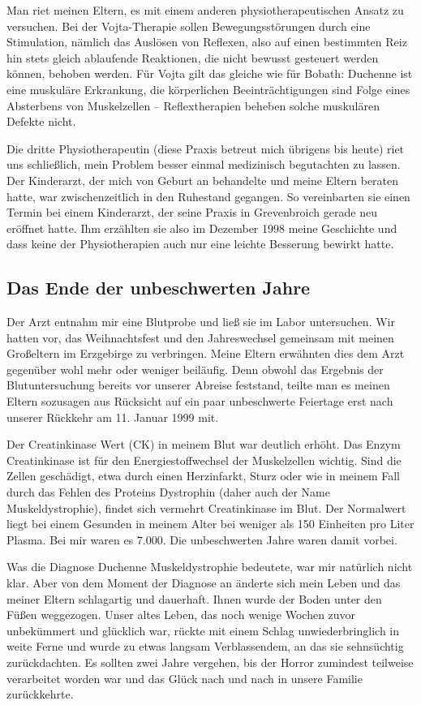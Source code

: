 \documentclass[fontsize=14pt,a4paper,headinclude,DIV=calc,automark]{scrbook}
\begin{document}
Man riet meinen Eltern, es mit einem anderen physiotherapeutischen Ansatz zu versuchen. Bei der Vojta-Therapie sollen Bewegungsstörungen durch eine Stimulation, nämlich das Auslösen von Reflexen, also auf einen bestimmten Reiz hin stets gleich ablaufende Reaktionen, die nicht bewusst gesteuert werden können, behoben werden. Für Vojta gilt das gleiche wie für Bobath: Duchenne ist eine muskuläre Erkrankung, die körperlichen Beeinträchtigungen sind Folge eines Absterbens von Muskelzellen – Reflextherapien beheben solche muskulären Defekte nicht.

Die dritte Physiotherapeutin (diese Praxis betreut mich übrigens bis heute) riet uns schließlich, mein Problem besser einmal medizinisch begutachten zu lassen. Der Kinderarzt, der mich von Geburt an behandelte und meine Eltern beraten hatte, war zwischenzeitlich in den Ruhestand gegangen. So vereinbarten sie einen Termin bei einem Kinderarzt, der seine Praxis in Grevenbroich gerade neu eröffnet hatte. Ihm erzählten sie also im Dezember 1998 meine Geschichte und dass keine der Physiotherapien auch nur eine leichte Besserung bewirkt hatte.

\subsection{Das Ende der unbeschwerten Jahre}

Der Arzt entnahm mir eine Blutprobe und ließ sie im Labor untersuchen. Wir hatten vor, das Weihnachtsfest und den Jahreswechsel gemeinsam mit meinen Großeltern im Erzgebirge zu verbringen. Meine Eltern erwähnten dies dem Arzt gegenüber wohl mehr oder weniger beiläufig. Denn obwohl das Ergebnis der Blutuntersuchung bereits vor unserer Abreise feststand, teilte man es meinen Eltern sozusagen aus Rücksicht auf ein paar unbeschwerte Feiertage erst nach unserer Rückkehr am 11. Januar 1999 mit.

Der Creatinkinase Wert (CK) in meinem Blut war deutlich erhöht. Das Enzym Creatinkinase ist für den Energiestoffwechsel der Muskelzellen wichtig. Sind die Zellen geschädigt, etwa durch einen Herzinfarkt, Sturz oder wie in meinem Fall durch das Fehlen des Proteins Dystrophin (daher auch der Name Muskeldystrophie), findet sich vermehrt Creatinkinase im Blut. Der Normalwert liegt bei einem Gesunden in meinem Alter bei weniger als 150 Einheiten pro Liter Plasma. Bei mir waren es 7.000. Die unbeschwerten Jahre waren damit vorbei.

Was die Diagnose Duchenne Muskeldystrophie bedeutete, war mir natürlich nicht klar. Aber von dem Moment der Diagnose an änderte sich mein Leben und das meiner Eltern schlagartig und dauerhaft. Ihnen wurde der Boden unter den Füßen weggezogen. Unser altes Leben, das noch wenige Wochen zuvor unbekümmert und glücklich war, rückte mit einem Schlag unwiederbringlich in weite Ferne und wurde zu etwas langsam Verblassendem, an das sie sehnsüchtig zurückdachten. Es sollten zwei Jahre vergehen, bis der Horror zumindest teilweise verarbeitet worden war und das Glück nach und nach in unsere Familie zurückkehrte.
\end{document}
